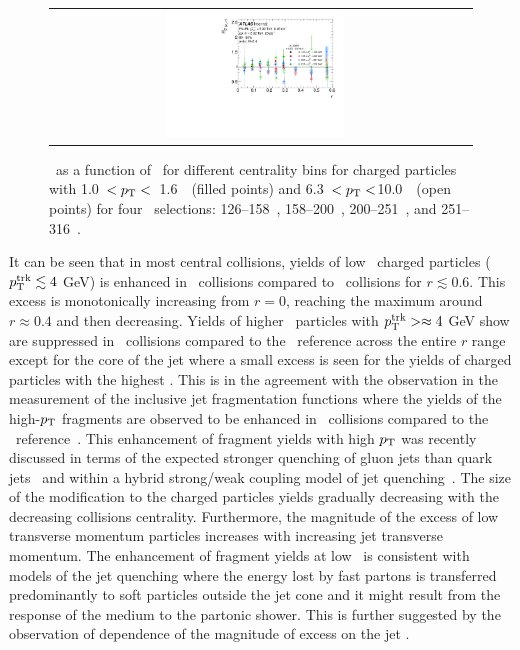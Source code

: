 \begin{figure}
{\begin{tabular}{cc}
	 \includegraphics[width=0.45\textwidth]{figures_results/RDpT_final_ratio_dR_CONF_data_trk_cent5} \\
\end{tabular} }
   \caption{\RDptr\ as a function of \rvar\ for different centrality bins for charged particles with 1.0~$< p_{\mathrm{T}} <$~1.6~\GeV\
(filled points) and 6.3~$< p_{\mathrm{T}} <$10.0~\GeV\ (open points) for four \ptjet\ selections: 126--158~\GeV, 158--200~\GeV,
200--251~\GeV, and 251--316~\GeV.}
      \label{fig:ptjetdep}
\end{figure}





It can be seen that in most central collisions, yields of low \pt\ charged particles ($\mbox{$p_{\mathrm{T}}^{\mathrm{trk}}$} \lesssim 4$ GeV) is enhanced in \PbPb\ collisions compared to \pp\ collisions for $r \lesssim 0.6$. This excess is monotonically increasing from $r=0$, reaching the maximum around $r\approx0.4$ and then decreasing. Yields of higher \pt\ particles with $\mbox{$p_{\mathrm{T}}^{\mathrm{trk}}$} > \approx 4$ GeV show are suppressed in \PbPb\ collisions compared to the \pp\ reference across the entire $r$ range except for the core of the jet where a small excess is seen for the yields of charged particles with the highest \pT. This is in the agreement with the observation in the measurement of the inclusive jet fragmentation functions where the yields of the high-$p_{\mathrm{T}}$ fragments are observed to be enhanced in \PbPb\ collisions compared to the \pp\ reference~\cite{ATLAS502FFConf}. This enhancement of fragment yields with high $p_{\mathrm{T}}$ was recently discussed in terms of the expected stronger quenching of  gluon jets than quark jets~\cite{Spousta:2015fca} and within a hybrid strong/weak coupling model of jet quenching~\cite{Hulcher:2017cpt}.  The size of the modification to the charged particles yields gradually decreasing with the  decreasing collisions centrality. Furthermore, the magnitude of the excess of low transverse momentum particles increases with increasing jet transverse momentum. The enhancement of fragment yields at low \pT\ is consistent with models of the jet quenching where the energy lost by fast partons is transferred predominantly to soft particles outside the jet cone and it might result from the response of the medium to the partonic shower. This is further suggested by the observation of dependence of the magnitude of excess on the jet \pt.




